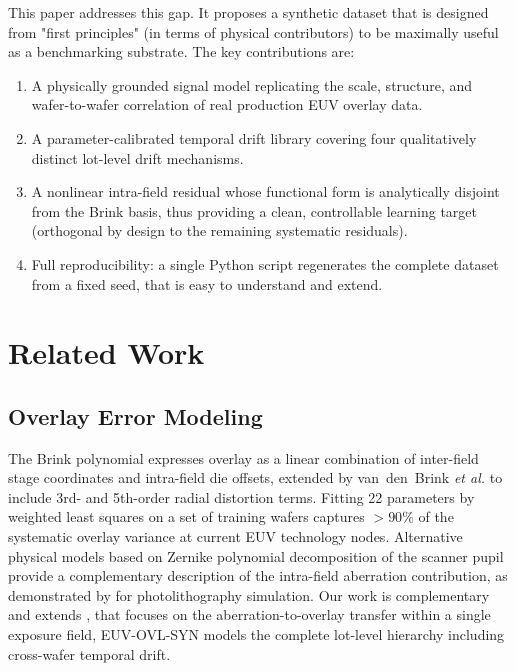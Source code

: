 \documentclass[10pt,conference]{IEEEtran}
\begin{document}
This paper addresses this gap. It proposes a synthetic dataset that is
designed from "first principles" (in terms of physical contributors) to be maximally useful as a benchmarking
substrate.  The key contributions are:
\begin{enumerate}
  \item A physically grounded signal model replicating the scale, structure,
        and wafer-to-wafer correlation of real production EUV overlay data.
  \item A parameter-calibrated temporal drift library covering four
        qualitatively distinct lot-level drift mechanisms.
  \item A nonlinear intra-field residual whose functional form is analytically
        disjoint from the Brink basis, thus providing a clean, controllable
        learning target (orthogonal by design to the remaining systematic residuals).
  \item Full reproducibility: a single Python script regenerates the complete
        dataset from a fixed seed, that is easy to understand and extend.
\end{enumerate}

\section{Related Work}

\subsection{Overlay Error Modeling}

The Brink polynomial \cite{brink1994} expresses overlay as a linear
combination of inter-field stage coordinates and intra-field die offsets,
extended by van~den~Brink \textit{et al.} \cite{vandenBrink1996} to include
3rd- and 5th-order radial distortion terms.  Fitting 22 parameters by
weighted least squares on a set of training wafers captures
$>90\%$ of the systematic overlay variance at current EUV technology nodes.
Alternative physical models based on Zernike polynomial decomposition of the
scanner pupil \cite{bornwolf1999, erdmann2021} provide a complementary
description of the intra-field aberration contribution, as demonstrated by
\cite{magklaras2025} for photolithography simulation.  Our work is
complementary and extends \cite{magklaras2025}, that focuses on the
aberration-to-overlay transfer within a single exposure field, EUV-OVL-SYN
models the complete lot-level hierarchy including cross-wafer temporal drift.
\end{document}
